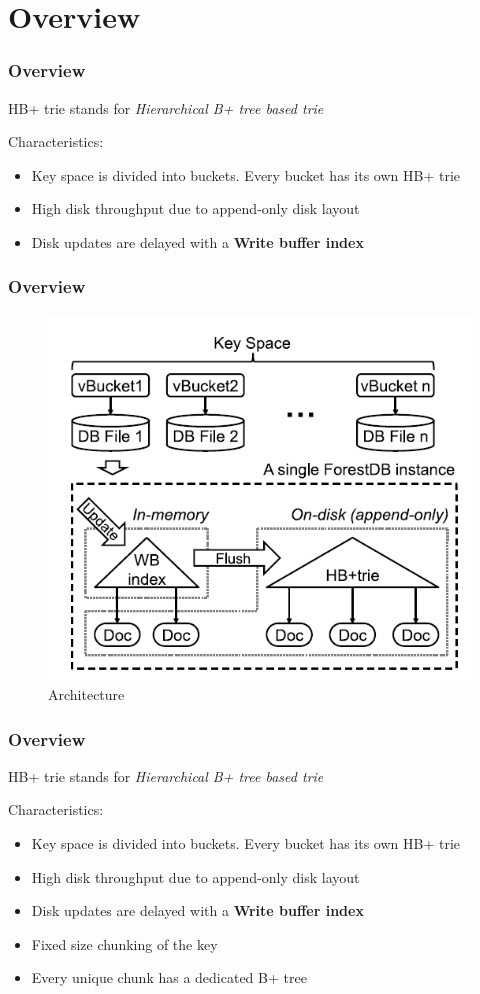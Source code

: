 \documentclass[aspectratio=169]{beamer}
\begin{document}
\section{Overview}
\begin{frame}[t]
    \frametitle{Overview}
    HB+ trie stands for \textit{Hierarchical B+ tree based trie}
    
    Characteristics:
    \begin{itemize}
    	\item Key space is divided into buckets. Every bucket has its own HB+ trie
    	\item High disk throughput due to append-only disk layout
    	\item Disk updates are delayed with a \textbf{Write buffer index}
    \end{itemize}
\end{frame}
\begin{frame}[t]
	\frametitle{Overview}
	\begin{figure}[h!]
		\includegraphics[scale=0.5]{architecture}
		\caption{Architecture}
	\end{figure}
	\centering
\end{frame}
\begin{frame}[t]
	\frametitle{Overview}
	HB+ trie stands for \textit{Hierarchical B+ tree based trie}
	
	Characteristics:
	\begin{itemize}
		\item Key space is divided into buckets. Every bucket has its own HB+ trie
		\item High disk throughput due to append-only disk layout
		\item Disk updates are delayed with a \textbf{Write buffer index}
		\item Fixed size chunking of the key
		\item Every unique chunk has a dedicated B+ tree
	\end{itemize}	
\end{frame}
\end{document}
